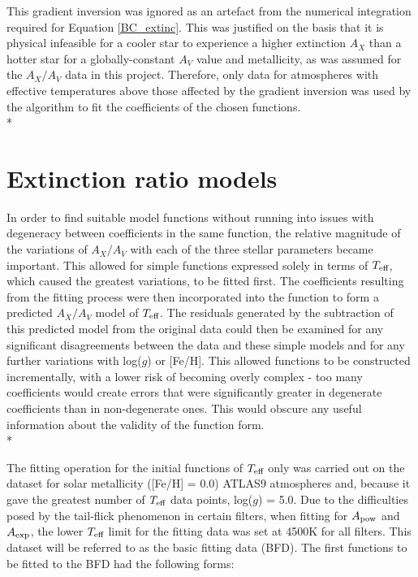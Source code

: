 \documentclass[12pt, a4paper]{report}
\begin{document}
This gradient inversion was ignored as an artefact from the numerical integration required for Equation \ref{BC_extinc}. This was justified on the basis that it is physical infeasible for a cooler star to experience a higher extinction $A_{X}$ than a hotter star for a globally-constant $A_{V}$ value and metallicity, as was assumed for the $A_{X}/A_{V}$ data in this project. Therefore, only data for atmospheres with effective temperatures above those affected by the gradient inversion was used by the algorithm to fit the coefficients of the chosen functions.\\*

\section{Extinction ratio models} \label{ext_models}

In order to find suitable model functions without running into issues with degeneracy between coefficients in the same function, the relative magnitude of the variations of $A_{X}/A_{V}$ with each of the three stellar parameters became important. This allowed for simple functions expressed solely in terms of $T_{\textnormal{eff}}$, which caused the greatest variations, to be fitted first. The coefficients resulting from the fitting process were then incorporated into the function to form a predicted $A_{X}/A_{V}$ model of $T_{\textnormal{eff}}$. The residuals generated by the subtraction of this predicted model from the original data could then be examined for any significant disagreements between the data and these simple models and for any further variations with log($g$) or [Fe/H]. This allowed functions to be constructed incrementally, with a lower risk of becoming overly complex - too many coefficients would create errors that were significantly greater in degenerate coefficients than in non-degenerate ones. This would obscure any useful information about the validity of the function form. \\*

The fitting operation for the initial functions of $T_{\textnormal{eff}}$ only was carried out on the dataset for solar metallicity ([Fe/H] = 0.0) ATLAS9 atmospheres and, because it gave the greatest number of $T_{\textnormal{eff}}$ data points, log($g$) = 5.0. Due to the difficulties posed by the tail-flick phenomenon in certain filters, when fitting for $A_{\textnormal{pow}}$ and $A_{\textnormal{exp}}$, the lower $T_{\textnormal{eff}}$ limit for the fitting data was set at 4500K for all filters. This dataset will be referred to as the basic fitting data (BFD). The first functions to be fitted to the BFD had the following forms:
\end{document}
